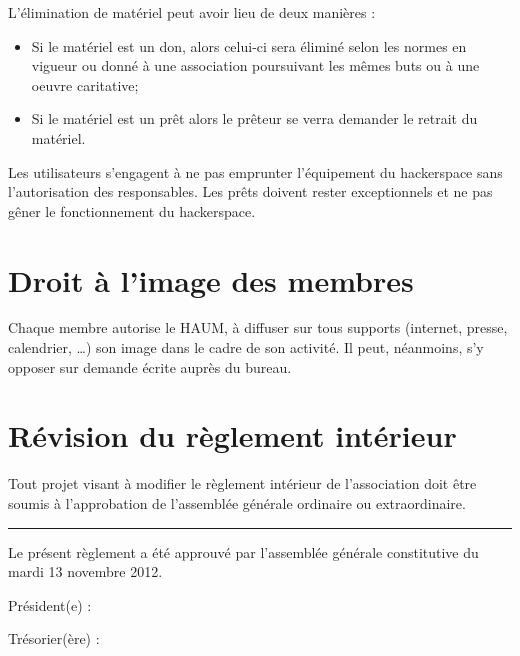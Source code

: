 \documentclass[a4paper, 11pt]{article}
\newcommand{\nomHS}{HAUM}
\newcommand{\dateAGC}{mardi 13 novembre 2012}
\newcommand\sep{\noindent\rule{\linewidth}{.5pt}}
\begin{document}
L'élimination de matériel peut avoir lieu de deux manières :

\begin{itemize}
    \item Si le matériel est un don, alors celui-ci sera éliminé selon les normes en vigueur ou donné à une association poursuivant les mêmes buts ou à une oeuvre caritative;
    \item Si le matériel est un prêt alors le prêteur se verra demander le retrait du matériel.
\end{itemize}

Les utilisateurs s'engagent à ne pas emprunter l'équipement du hackerspace sans l'autorisation des responsables. Les prêts doivent rester exceptionnels et ne pas gêner le fonctionnement du hackerspace.


\section{Droit à l'image des membres} %

Chaque membre autorise le \nomHS{}, à diffuser sur tous supports (internet, presse, calendrier, …) son image dans le cadre de son activité.  Il peut, néanmoins, s'y opposer sur demande écrite auprès du bureau.


\section{Révision du règlement intérieur} %

Tout projet visant à modifier le règlement intérieur de l'association doit être soumis à l'approbation de l'assemblée
générale ordinaire ou extraordinaire.

\bigskip\bigskip

\sep

\bigskip\bigskip

Le présent règlement a été approuvé par l'assemblée générale constitutive du \dateAGC.

\bigskip\bigskip

Président(e) :


\bigskip\bigskip

Trésorier(ère) :
\end{document}
